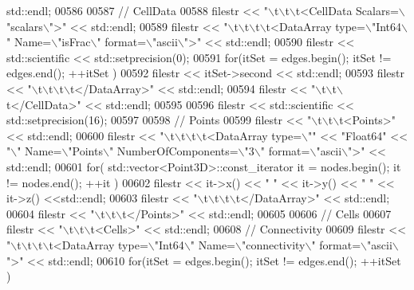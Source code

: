 \begin{DoxyCode}
      std::endl;
00586 
00587     \textcolor{comment}{// CellData}
00588     filestr << \textcolor{stringliteral}{"\(\backslash\)t\(\backslash\)t\(\backslash\)t<CellData Scalars=\(\backslash\)"scalars\(\backslash\)">"} << std::endl;
00589     filestr << \textcolor{stringliteral}{"\(\backslash\)t\(\backslash\)t\(\backslash\)t\(\backslash\)t<DataArray type=\(\backslash\)"Int64\(\backslash\)" Name=\(\backslash\)"isFrac\(\backslash\)" format=\(\backslash\)"ascii\(\backslash\)">"} << std::endl;
00590     filestr << std::scientific << std::setprecision(0);
00591     \textcolor{keywordflow}{for}(itSet = edges.begin(); itSet != edges.end(); ++itSet )
00592         filestr << itSet->second << std::endl;
00593     filestr << \textcolor{stringliteral}{"\(\backslash\)t\(\backslash\)t\(\backslash\)t\(\backslash\)t</DataArray>"} << std::endl;
00594     filestr << \textcolor{stringliteral}{"\(\backslash\)t\(\backslash\)t\(\backslash\)t</CellData>"} << std::endl;
00595 
00596     filestr << std::scientific << std::setprecision(16);
00597 
00598     \textcolor{comment}{// Points}
00599     filestr << \textcolor{stringliteral}{"\(\backslash\)t\(\backslash\)t\(\backslash\)t<Points>"} << std::endl;
00600     filestr << \textcolor{stringliteral}{"\(\backslash\)t\(\backslash\)t\(\backslash\)t\(\backslash\)t<DataArray type=\(\backslash\)""} << \textcolor{stringliteral}{"Float64"} << \textcolor{stringliteral}{"\(\backslash\)" Name=\(\backslash\)"Points\(\backslash\)" NumberOfComponents=\(\backslash\)"3\(\backslash\)"
       format=\(\backslash\)"ascii\(\backslash\)">"} << std::endl;
00601     \textcolor{keywordflow}{for}( std::vector<Point3D>::const\_iterator it = nodes.begin(); it != nodes.end(); ++it )
00602         filestr << it->x() << \textcolor{stringliteral}{" "} << it->y() << \textcolor{stringliteral}{" "} << it->z() <<std::endl;
00603     filestr << \textcolor{stringliteral}{"\(\backslash\)t\(\backslash\)t\(\backslash\)t\(\backslash\)t</DataArray>"} << std::endl;
00604     filestr << \textcolor{stringliteral}{"\(\backslash\)t\(\backslash\)t\(\backslash\)t</Points>"} << std::endl;
00605 
00606     \textcolor{comment}{// Cells}
00607     filestr << \textcolor{stringliteral}{"\(\backslash\)t\(\backslash\)t\(\backslash\)t<Cells>"} << std::endl;
00608     \textcolor{comment}{//  Connectivity}
00609     filestr << \textcolor{stringliteral}{"\(\backslash\)t\(\backslash\)t\(\backslash\)t\(\backslash\)t<DataArray type=\(\backslash\)"Int64\(\backslash\)" Name=\(\backslash\)"connectivity\(\backslash\)" format=\(\backslash\)"ascii\(\backslash\)">"} << std::endl;
00610     \textcolor{keywordflow}{for}(itSet = edges.begin(); itSet != edges.end(); ++itSet )

\end{DoxyCode}
